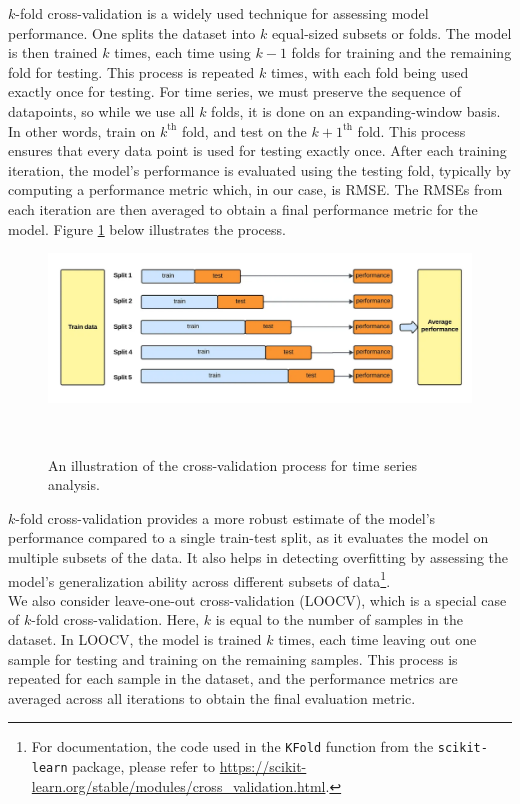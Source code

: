 \documentclass{ledger}
\begin{document}
$k$-fold cross-validation is a widely used technique for assessing model performance. One splits the dataset into $k$ equal-sized subsets or folds. The model is then trained $k$ times, each time using $k-1$ folds for training and the remaining fold for testing. This process is repeated $k$ times, with each fold being used exactly once for testing. For time series, we must preserve the sequence of datapoints, so while we use all $k$ folds, it is done on an expanding-window basis. In other words, train on $k^{\text{th}}$ fold, and test on the $k+1^{\text{th}}$ fold. This process ensures that every data point is used for testing exactly once. After each training iteration, the model's performance is evaluated using the testing fold, typically by computing a performance metric which, in our case, is RMSE. The RMSEs from each iteration are then averaged to obtain a final performance metric for the model. Figure \ref{figure:cross_validation} below illustrates the process. \\

\begin{figure}[!ht]
\centering
	\includegraphics[width=375pt]{cross_validation_timeseries.pdf}
	\caption{An illustration of the cross-validation process for time series analysis.\label{figure:cross_validation}} ~\\
\end{figure}


$k$-fold cross-validation provides a more robust estimate of the model's performance compared to a single train-test split, as it evaluates the model on multiple subsets of the data. It also helps in detecting overfitting by assessing the model's generalization ability across different subsets of data\footnote{For documentation, the code used in the \texttt{KFold} function from the \texttt{scikit-learn} package, please refer to \href{https://scikit-learn.org/stable/modules/cross\_validation.html}{https://scikit-learn.org/stable/modules/cross\_validation.html}.}. \\

We also consider leave-one-out cross-validation (LOOCV), which is a special case of $k$-fold cross-validation. Here, $k$ is equal to the number of samples in the dataset. In LOOCV, the model is trained $k$ times, each time leaving out one sample for testing and training on the remaining samples. This process is repeated for each sample in the dataset, and the performance metrics are averaged across all iterations to obtain the final evaluation metric. \\
\end{document}

